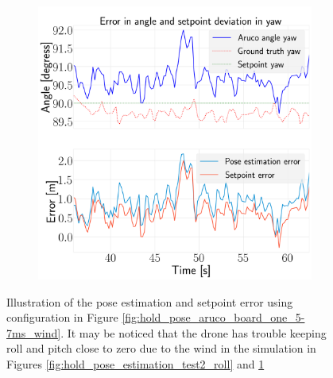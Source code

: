 \documentclass[../Head/report.tex]{subfiles}
\begin{document}
\begin{figure}[H]
\begin{subfigure}[t]{.30\textwidth}
        \caption{}
        \label{fig:hold_pose_estimation_test2_pitch}
    \end{subfigure}
     \hspace{0.2em}
    \begin{subfigure}[t]{.30\textwidth}
        \centering
        \includegraphics[width=\textwidth]{../Figures/hold_pose_using_aruco_pose_estimation/test2_gps2visionBoard_1.0Wind_-1.0y/error_yaw/pose_error_yaw_test1.png}
        \caption{}
        \label{fig:hold_pose_estimation_test2_yaw}
    \end{subfigure}
    \caption{Illustration of the pose estimation and setpoint error using configuration in Figure \ref{fig:hold_pose_aruco_board_one_5-7ms_wind}. It may be noticed that the drone has trouble keeping roll and pitch close to zero due to the wind in the simulation in Figures \ref{fig:hold_pose_estimation_test2_roll} and \ref{fig:hold_pose_estimation_test2_pitch}}
    \label{fig:hold_pose_estimation_test2_error_angle}
\end{figure}
\end{document}
